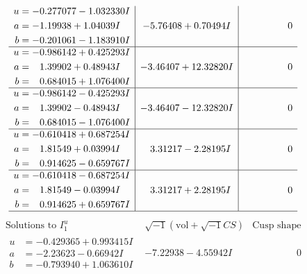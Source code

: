 \documentclass[1p]{elsarticle_modified}
\theoremstyle{definition}
\newcommand{\I}{\sqrt{-1}}
\begin{document}
$$\begin{array}{c|c|c}
\begin{aligned}
u &= -0.277077 - 1.032330 I \\
a &= -1.19938 + 1.04039 I \\
b &= -0.201061 - 1.183910 I\end{aligned}
 & -5.76408 + 0.70494 I & \phantom{-0.000000 } 0 \\ \hline\begin{aligned}
u &= -0.986142 + 0.425293 I \\
a &= \phantom{-}1.39902 + 0.48943 I \\
b &= \phantom{-}0.684015 + 1.076400 I\end{aligned}
 & -3.46407 + 12.32820 I & \phantom{-0.000000 } 0 \\ \hline\begin{aligned}
u &= -0.986142 - 0.425293 I \\
a &= \phantom{-}1.39902 - 0.48943 I \\
b &= \phantom{-}0.684015 - 1.076400 I\end{aligned}
 & -3.46407 - 12.32820 I & \phantom{-0.000000 } 0 \\ \hline\begin{aligned}
u &= -0.610418 + 0.687254 I \\
a &= \phantom{-}1.81549 + 0.03994 I \\
b &= \phantom{-}0.914625 - 0.659767 I\end{aligned}
 & \phantom{-}3.31217 - 2.28195 I & \phantom{-0.000000 } 0 \\ \hline\begin{aligned}
u &= -0.610418 - 0.687254 I \\
a &= \phantom{-}1.81549 - 0.03994 I \\
b &= \phantom{-}0.914625 + 0.659767 I\end{aligned}
 & \phantom{-}3.31217 + 2.28195 I & \phantom{-0.000000 } 0\\
 \hline 
 \end{array}$$\newpage$$\begin{array}{c|c|c}  
\text{Solutions to }I^u_{1}& \I (\text{vol} + \sqrt{-1}CS) & \text{Cusp shape}\\
 \hline 
\begin{aligned}
u &= -0.429365 + 0.993415 I \\
a &= -2.23623 - 0.66942 I \\
b &= -0.793940 + 1.063610 I\end{aligned}
 & -7.22938 - 4.55942 I & \phantom{-0.000000 } 0 \\ \hline\begin{aligned}

\end{aligned}
\end{array}$$
\end{document}
